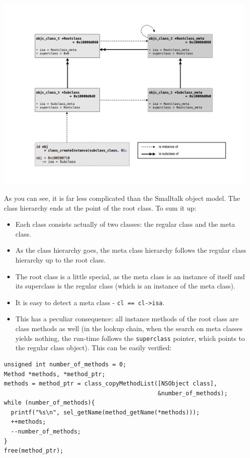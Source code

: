 \includegraphics[width=130mm]{img/metaclass_graph.png}

As you can see, it is far less complicated than the Smalltalk object model. The class hierarchy ends at the point of the root class. To sum it up:

\begin{itemize}
\item Each class consists actually of two classes: the regular class and the meta class.
\item As the class hierarchy goes, the meta class hierarchy follows the regular class hierarchy up to the root class.
\item The root class is a little special, as the meta class is an instance of itself and its superclass is the regular class (which is an instance of the meta class).
\item It is easy to detect a meta class - \verb:cl == cl->isa:.
\item This has a peculiar consequence: all instance methods of the root class are class methods as well (in the lookup chain, when the search on meta classes yields nothing, the run-time follows the \verb=superclass= pointer, which points to the regular class object). This can be easily verified:
\end{itemize}

\begin{verbatim}
unsigned int number_of_methods = 0;
Method *methods, *method_ptr;
methods = method_ptr = class_copyMethodList([NSObject class], 
                                            &number_of_methods);
while (number_of_methods){
  printf("%s\n", sel_getName(method_getName(*methods)));
  ++methods;
  --number_of_methods;
}
free(method_ptr);
\end{verbatim}

